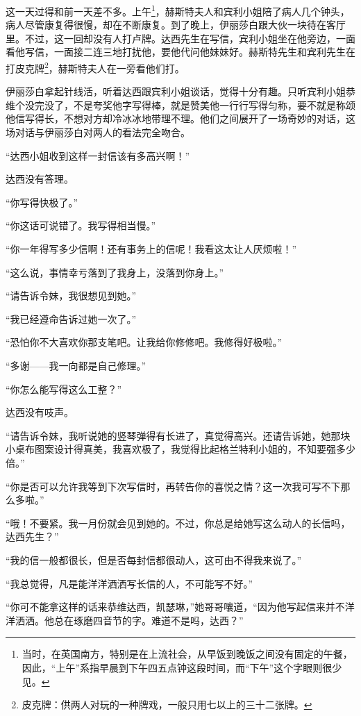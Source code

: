 \par 这一天过得和前一天差不多。上午\footnote{当时，在英国南方，特别是在上流社会，从早饭到晚饭之间没有固定的午餐，因此，“上午”系指早晨到下午四五点钟这段时间，而“下午”这个字眼则很少见。}，赫斯特夫人和宾利小姐陪了病人几个钟头，病人尽管康复得很慢，却在不断康复。到了晚上，伊丽莎白跟大伙一块待在客厅里。不过，这一回却没有人打卢牌。达西先生在写信，宾利小姐坐在他旁边，一面看他写信，一面接二连三地打扰他，要他代问他妹妹好。赫斯特先生和宾利先生在打皮克牌\footnote{皮克牌：供两人对玩的一种牌戏，一般只用七以上的三十二张牌。}，赫斯特夫人在一旁看他们打。
\par 伊丽莎白拿起针线活，听着达西跟宾利小姐谈话，觉得十分有趣。只听宾利小姐恭维个没完没了，不是夸奖他字写得棒，就是赞美他一行行写得匀称，要不就是称颂他信写得长，不想对方却冷冰冰地带理不理。他们之间展开了一场奇妙的对话，这场对话与伊丽莎白对两人的看法完全吻合。
\par “达西小姐收到这样一封信该有多高兴啊！”
\par 达西没有答理。
\par “你写得快极了。”
\par “你这话可说错了。我写得相当慢。”
\par “你一年得写多少信啊！还有事务上的信呢！我看这太让人厌烦啦！”
\par “这么说，事情幸亏落到了我身上，没落到你身上。”
\par “请告诉令妹，我很想见到她。”
\par “我已经遵命告诉过她一次了。”
\par “恐怕你不大喜欢你那支笔吧。让我给你修修吧。我修得好极啦。”
\par “多谢——我一向都是自己修理。”
\par “你怎么能写得这么工整？”
\par 达西没有吱声。
\par “请告诉令妹，我听说她的竖琴弹得有长进了，真觉得高兴。还请告诉她，她那块小桌布图案设计得真美，我喜欢极了，我觉得比起格兰特利小姐的，不知要强多少倍。”
\par “你是否可以允许我等到下次写信时，再转告你的喜悦之情？这一次我可写不下那么多啦。”
\par “哦！不要紧。我一月份就会见到她的。不过，你总是给她写这么动人的长信吗，达西先生？”
\par “我的信一般都很长，但是否每封信都很动人，这可由不得我来说了。”
\par “我总觉得，凡是能洋洋洒洒写长信的人，不可能写不好。”
\par “你可不能拿这样的话来恭维达西，凯瑟琳，”她哥哥嚷道，“因为他写起信来并不洋洋洒洒。他总在琢磨四音节的字。难道不是吗，达西？”
